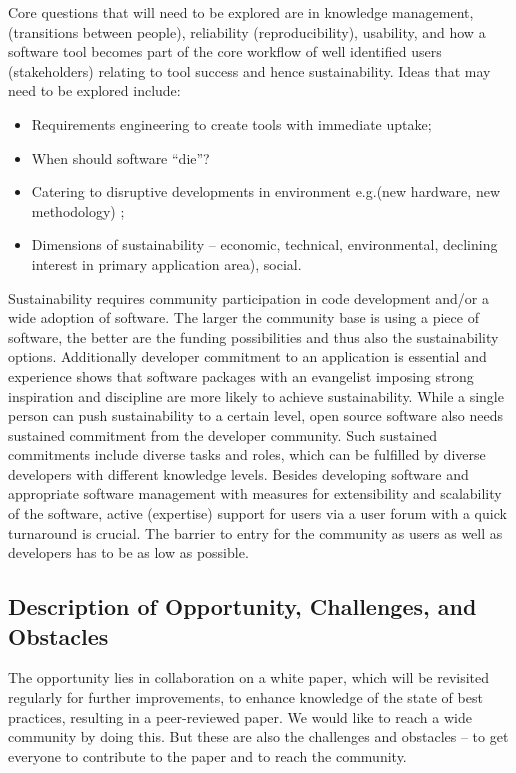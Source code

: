 Core questions that will need to be explored are in knowledge management, 
(transitions between people), reliability (reproducibility), usability, and how a software tool becomes part of the core workflow of well identified users (stakeholders)
relating to tool success and hence sustainability.  Ideas 
that may need to be explored include:
\begin{itemize}
\item Requirements engineering to create tools with immediate uptake;
\item When should software ``die''?
\item Catering to disruptive developments in environment e.g.(new hardware, new methodology) ;
\item Dimensions of sustainability -- economic, technical, environmental, 
declining interest in primary application area),  social.
\end{itemize}

Sustainability requires community participation in code development and/or a wide adoption of software.
The larger the community base is using a piece of software, the better are the funding possibilities and thus also the sustainability options.
Additionally developer commitment to an application is essential and experience shows that software packages with an evangelist imposing strong inspiration and discipline are more likely to achieve sustainability.
While a single person can push sustainability to a certain level, open source software also needs sustained commitment from the developer community.
Such sustained commitments include diverse tasks and roles, which can be fulfilled by diverse developers with different knowledge levels.
Besides developing software and appropriate software management with measures for extensibility and scalability of the software, active (expertise) support for users via a user forum with a quick turnaround is crucial.
The barrier to entry for the community as users as well as developers has to be as low as possible.

\subsection{Description of Opportunity, Challenges, and Obstacles}

The opportunity lies in collaboration on a white paper, which will be revisited regularly for further improvements, to enhance knowledge of the state of best practices, resulting in a peer-reviewed paper. We would like to reach a wide community by doing this. But these are also the challenges and obstacles -- to get everyone to contribute to the paper and to reach the community.


